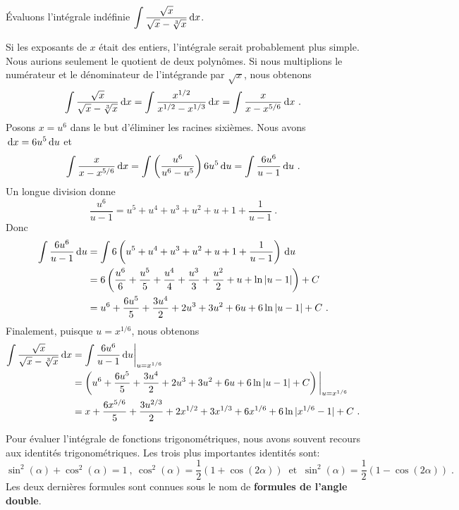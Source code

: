 {\begin{egg}
Évaluons l'intégrale indéfinie
$\displaystyle \int \frac{\sqrt{x}}{\sqrt{x} - \sqrt[3]{x}} \,\mathrm{d}x$.

Si les exposants de $x$ était des entiers, l'intégrale serait
probablement plus simple.  Nous aurions seulement le quotient de deux
polynômes.  Si nous multiplions le numérateur et le dénominateur de
l'intégrande par $\sqrt{x}$, nous obtenons
\[
\int \frac{\sqrt{x}}{\sqrt{x} - \sqrt[3]{x}} \,\mathrm{d}x
= \int \frac{x^{1/2}}{x^{1/2} - x^{1/3}} \,\mathrm{d}x
= \int \frac{x}{x - x^{5/6}} \,\mathrm{d}x \ .
\]
Posons $x= u^6$ dans le but d'éliminer les racines sixièmes.  Nous avons
$\displaystyle \,\mathrm{d}x = 6u^5 \,\mathrm{d}u$ et
\[
\int \frac{x}{x - x^{5/6}} \,\mathrm{d}x
= \int \left(\frac{u^6}{u^6 - u^5}\right) 6u^5 \,\mathrm{d}u
= \int \frac{6u^{6}}{u - 1}\,\mathrm{d}u \ .
\]
Un longue division donne
\[
\frac{u^6}{u-1} = u^5 + u^4 + u^3 + u^2 + u + 1 + \frac{1}{u-1} \ .
\]
Donc
\begin{align*}
\int \frac{6u^{6}}{u - 1}\,\mathrm{d}u &=
\int 6\left(u^5 + u^4 + u^3 + u^2 + u + 1 + \frac{1}{u-1}\right) \,\mathrm{d}u \\
&= 6\left(\frac{u^6}{6} + \frac{u^5}{5} + \frac{u^4}{4} + \frac{u^3}{3} +
\frac{u^2}{2} + u + \ln|u-1|\right) + C \\
&= u^6 + \frac{6u^5}{5} + \frac{3u^4}{2} + 2u^3 +
3u^2 + 6u + 6\ln|u-1| + C \ .
\end{align*}
Finalement, puisque $u=x^{1/6}$, nous obtenons
\begin{align*}
\int \frac{\sqrt{x}}{\sqrt{x} - \sqrt[3]{x}} \,\mathrm{d}x
&= \int \frac{6u^{6}}{u - 1}\,\mathrm{d}u \bigg|_{u=x^{1/6}} \\
&= \left( u^6 + \frac{6u^5}{5} + \frac{3u^4}{2} + 2u^3 +
3u^2 + 6u + 6\ln|u-1| + C\right)\bigg|_{u=x^{1/6}} \\
&= x + \frac{6x^{5/6}}{5} + \frac{3u^{2/3}}{2} + 2x^{1/2} +
3x^{1/3} + 6x^{1/6} + 6\ln|x^{1/6}-1| + C \ .
\end{align*}
\end{egg}

Pour évaluer l'intégrale de fonctions trigonométriques, nous avons souvent
recours aux identités trigonométriques.  Les trois plus importantes
identités sont:
\[
\sin^2(\alpha) + \cos^2(\alpha) = 1 \ ,
\ \cos^2(\alpha) = \frac{1}{2}(1 + \cos(2\alpha)) \ \text{ et } 
\ \sin^2(\alpha) = \frac{1}{2}(1 - \cos(2\alpha))\; .
\]
Les deux dernières formules sont connues sous le nom de
{\bfseries formules de l'angle double}.

}
